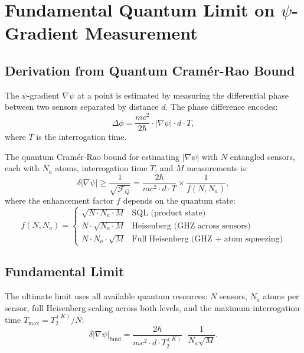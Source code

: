 \documentclass[11pt]{article}
\theoremstyle{definition}
\theoremstyle{remark}
\begin{document}
\section{Fundamental Quantum Limit on $\psi$-Gradient Measurement}
\label{sec:quantum-limit}

\subsection{Derivation from Quantum Cram\'er-Rao Bound}

The $\psi$-gradient $\nabla\psi$ at a point is estimated by measuring
the differential phase between two sensors separated by distance $d$.
The phase difference encodes:
\begin{equation}
\Delta\phi = \frac{mc^2}{2\hbar} \cdot |\nabla\psi| \cdot d \cdot T,
\end{equation}
where $T$ is the interrogation time.

The quantum Cram\'er-Rao bound for estimating $|\nabla\psi|$ with
$N$ entangled sensors, each with $N_a$ atoms, interrogation time $T$,
and $M$ measurements is:
\begin{equation}
\delta|\nabla\psi| \geq \frac{1}{\sqrt{\mathcal{F}_Q}} = \frac{2\hbar}{mc^2 \cdot d \cdot T}
\times \frac{1}{f(N, N_a)},
\end{equation}
where the enhancement factor $f$ depends on the quantum state:
\begin{equation}
f(N, N_a) = \begin{cases}
\sqrt{N \cdot N_a \cdot M} & \text{SQL (product state)} \\
N \cdot \sqrt{N_a \cdot M} & \text{Heisenberg (GHZ across sensors)} \\
N \cdot N_a \cdot \sqrt{M} & \text{Full Heisenberg (GHZ + atom squeezing)}
\end{cases}
\end{equation}

\subsection{Fundamental Limit}

The ultimate limit uses all available quantum resources: $N$ sensors,
$N_a$ atoms per sensor, full Heisenberg scaling across both levels,
and the maximum interrogation time $T_{\max} = T_2^{(K)}/N$:
\begin{equation}
\boxed{\delta|\nabla\psi|_{\mathrm{fund}} = \frac{2\hbar}{mc^2 \cdot d \cdot T_2^{(K)}}
\cdot \frac{1}{N_a \sqrt{M}}.}
\label{eq:fundamental-limit}
\end{equation}
\end{document}
